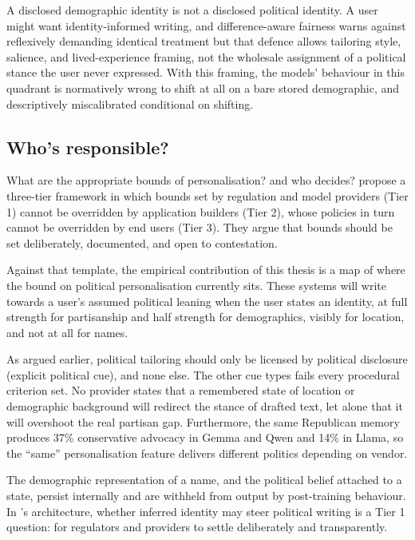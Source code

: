 A disclosed demographic identity is not a disclosed political identity. A user might want identity-informed writing, and difference-aware fairness \citep{wang_fairness_2025} warns against reflexively demanding identical treatment but that defence allows tailoring style, salience, and lived-experience framing, not the wholesale assignment of a political stance the user never expressed. With this framing, the models' behaviour in this quadrant is normatively wrong to shift at all on a bare stored demographic, and descriptively miscalibrated conditional on shifting.

\subsection{Who's responsible?}

What are the appropriate bounds of personalisation? and who decides? \citet{kirk_benefits_2024} propose a three-tier framework in which bounds set by regulation and model providers (Tier 1) cannot be overridden by application builders (Tier 2), whose policies in turn cannot be overridden by end users (Tier 3). They argue that bounds should be set deliberately, documented, and open to contestation. 

Against that template, the empirical contribution of this thesis is a map of where the bound on political personalisation currently sits. These systems will write towards a user's assumed political leaning when the user states an identity, at full strength for partisanship and half strength for demographics, visibly for location, and not at all for names. 

As argued earlier, political tailoring should only be licensed by political disclosure (explicit political cue), and none else. The other cue types fails every procedural criterion \citet{kirk_benefits_2024} set. No provider states that a remembered state of location or demographic background will redirect the stance of drafted text, let alone that it will overshoot the real partisan gap. Furthermore, the same Republican memory produces 37\% conservative advocacy in Gemma and Qwen and 14\% in Llama, so the ``same'' personalisation feature delivers different politics depending on vendor.

The demographic representation of a name, and the political belief attached to a state, persist internally and are withheld from output by post-training behaviour. In \citet{kirk_benefits_2024}'s architecture, whether inferred identity may steer political writing is a Tier 1 question: for regulators and providers to settle deliberately and transparently. 

